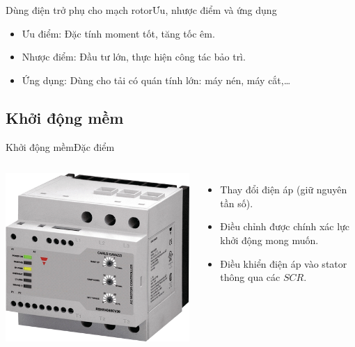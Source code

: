 \documentclass[17pt]{beamer}
\begin{document}
\begin{frame}{Dùng điện trở phụ cho mạch rotor}{Ưu, nhược điểm và ứng dụng}
\begin{itemize}
\item \alert{Ưu điểm}: Đặc tính moment tốt, tăng tốc êm.
\item \alert{Nhược điểm}: Đầu tư lớn, thực hiện công tác bảo trì.
\item \alert{Ứng dụng}: Dùng cho tải có quán tính lớn: máy nén, máy cắt,\ldots
\end{itemize}
\end{frame}

\subsection*{Khởi động mềm}
\begin{frame}{Khởi động mềm}{Đặc điểm}
\begin{columns}
\vspace{-2cm}
\begin{center}
\includegraphics[scale=.25]{images-chude1/khoidongmem.png} 
\end{center}
\begin{itemize}
\item Thay đổi điện áp (giữ nguyên tần số).
\item Điều chỉnh được chính xác lực khởi động mong muốn.
\item Điều khiển điện áp vào stator thông qua các $SCR$.
\end{itemize}
\end{columns}
\end{frame}
\end{document}
